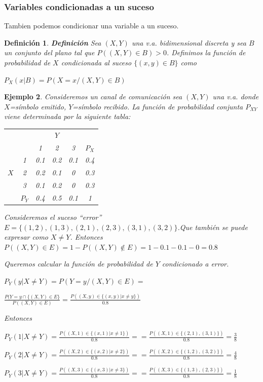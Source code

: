 \documentclass[12pt]{report}
\newtheorem{definition}{Definici\'on}
\newtheorem{example}[definition]{Ejemplo}
\begin{document}
\subsubsection{Variables condicionadas a un suceso}

Tambien podemos condicionar una variable a un suceso.

\begin{definition}
\textbf{Definición}  Sea $(X,Y)$ una v.a. bidimensional discreta  y sea $B$ un conjunto del plano tal que
$P((X,Y)\in B)>0$. Definimos la función de probabilidad de $X$ condicionada al suceso
$\{(x,y)\in B\}$ como

$P_{X}(x|B)=P(X=x/(X,Y)\in B)$
\end{definition}


\begin{example}
Consideremos un canal de comunicación sea $(X,Y)$ una v.a. donde $X$=símbolo emitido,
$Y$=símbolo recibido. La función de probabilidad conjunta $P_{XY}$ viene determinada por la
siguiente tabla:

\begin{center}\begin{tabular}{c|c|ccc|c}
   \multicolumn{2}{c|}{}  & \multicolumn{3}{|c|}{$Y$}  & \\
    \cline{3-6}
    \multicolumn{2}{c|}{} & 1 & 2 & 3 & $P_{X}$ \\
    \hline
     & 1 & 0.1 & 0.2 & 0.1 & 0.4  \\
    $X$ & 2 & 0.2 & 0.1 & 0 & 0.3  \\
   & 3 & 0.1 & 0.2 & 0 & 0.3  \\
   \cline{2-6}
     & $P_{Y}$ & 0.4 & 0.5 & 0.1 & 1  \\
    \hline
\end{tabular}
\end{center}


Consideremos el suceso ``error'' \newline
$E=\{(1,2),(1,3),(2,1),(2,3),(3,1),(3,2)\}$.\newline Que también se puede expresar como
$X\not=Y$. Entonces $P((X,Y)\in E)=1-P((X,Y)\not\in E)=1- 0.1-0.1-0=0.8$



Queremos calcular la función de probabilidad de $Y$ condicionado a error.

$P_{Y}(y|X\not=Y)=P(Y=y/(X,Y)\in E)=$

$\frac{P(Y=y\cap \{(X,Y)\in E\}}{P((X,Y)\in E)}=\frac{P((X,y)\in \{(x,y)|x\not= y\})}{0.8}$

Entonces

$P_{Y}(1|X\not=Y)=\frac{P((X,1)\in \{(x,1)|x\not= 1\})}{0.8}=$\newline $=\frac{P((X,1)\in
\{(2,1),(3,1)\})}{0.8}=\frac{3}{8}$

$P_{Y}(2|X\not=Y)=\frac{P((X,2)\in \{(x,2)|x\not= 2\})}{0.8}=$\newline $=\frac{P((X,2)\in
\{(1,2),(3,2)\})}{0.8}=\frac{4}{8}$

$P_{Y}(3|X\not=Y)=\frac{P((X,3)\in \{(x,3)|x\not= 3\})}{0.8}=$\newline $=\frac{P((X,3)\in
\{(1,3),(2,3)\})}{0.8}=\frac{1}{8}$
\end{example}
\end{document}
